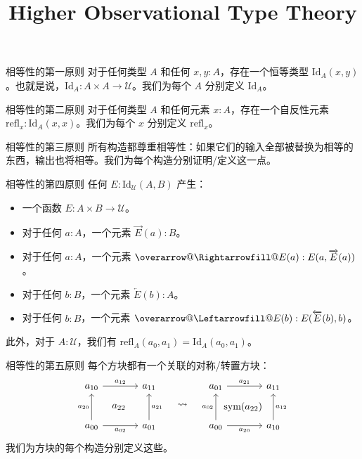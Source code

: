 \documentclass{beamer}
\title{Higher Observational Type Theory}
\date{}
\makeatletter
\newcommand{\overRightarrow}[1]{%
  \mathpalette{\overarrow@\Rightarrowfill@}{#1}%
}
\newcommand{\overLeftarrow}[1]{%
  \mathpalette{\overarrow@\Leftarrowfill@}{#1}%
}
\newcommand{\Id}{\text{Id}}
\newcommand{\refl}{\text{refl}}
\newcommand{\UU}{\mathcal{U}}
\makeatother
\begin{document}
\begin{frame}
    \titlepage
\end{frame}

\begin{frame}{相等性的第一原则}
对于任何类型 $A$ 和任何 $x, y : A$，存在一个恒等类型 $\Id_A(x, y)$。也就是说，$\Id_A : A \times A \to \UU$。我们为每个 $A$ 分别定义 $\Id_A$。
\end{frame}

\begin{frame}{相等性的第二原则}
对于任何类型 $A$ 和任何元素 $x : A$，存在一个自反性元素 $\refl_x : \Id_A(x, x)$。我们为每个 $x$ 分别定义 $\refl_x$。
\end{frame}

\begin{frame}{相等性的第三原则}
所有构造都尊重相等性：如果它们的输入全部被替换为相等的东西，输出也将相等。我们为每个构造分别证明/定义这一点。
\end{frame}

\begin{frame}{相等性的第四原则}
任何 $E : \Id_{\UU}(A, B)$ 产生：
\begin{itemize}
\item 一个函数 $E : A \times B \to \UU$。
\item 对于任何 $a : A$，一个元素 $\overrightarrow{E}(a) : B$。
\item 对于任何 $a : A$，一个元素 $\overRightarrow{E}(a) : E(a, \overrightarrow{E}(a))$。
\item 对于任何 $b : B$，一个元素 $\overleftarrow{E}(b) : A$。
\item 对于任何 $b : B$，一个元素 $\overLeftarrow{E}(b) : E(\overleftarrow{E}(b), b)$。
\end{itemize}
此外，对于 $A : \UU$，我们有 $\refl_A(a_0, a_1) = \Id_A(a_0, a_1)$。
\end{frame}

\begin{frame}[fragile]{相等性的第五原则}
每个方块都有一个关联的对称/转置方块：
\[
\begin{tikzcd}[row sep=large, column sep=large]
a_{10} \arrow[r, "a_{12}"] & a_{11}  \\
a_{00} \arrow[u, "a_{20}"] \arrow[r, "a_{02}"'] \arrow[ur, phantom, "a_{22}"] & a_{01} \arrow[u, "a_{21}"']
\end{tikzcd}
\quad\rightsquigarrow\quad
\begin{tikzcd}[row sep=large, column sep=large]
a_{01} \arrow[r, "a_{21}"] & a_{11}  \\
a_{00} \arrow[u, "a_{02}"] \arrow[r, "a_{20}"'] \arrow[ur, phantom, "\text{sym}(a_{22})"] & a_{10} \arrow[u, "a_{12}"']
\end{tikzcd}
\]
我们为方块的每个构造分别定义这些。
\end{frame}
\end{document}

